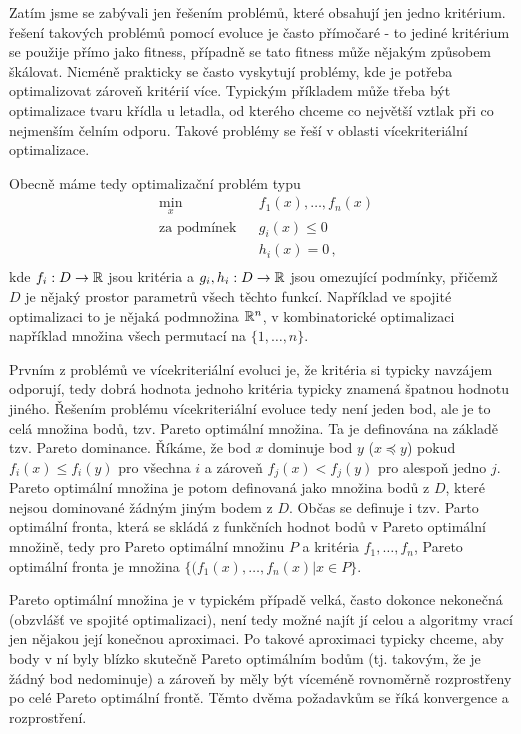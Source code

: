 
Zatím jsme se zabývali jen řešením problémů, které obsahují jen jedno kritérium. řešení takových problémů pomocí evoluce je často přímočaré - to jediné kritérium se použije přímo jako fitness, případně se tato fitness může nějakým způsobem škálovat. Nicméně prakticky se často vyskytují problémy, kde je potřeba optimalizovat zároveň kritérií více. Typickým příkladem může třeba být optimalizace tvaru křídla u letadla, od kterého chceme co největší vztlak při co nejmenším čelním odporu. Takové problémy se řeší v oblasti vícekriteriální optimalizace. 

Obecně máme tedy optimalizační problém typu
\begin{equation*}
  \begin{aligned}
  & \underset{x}{\text{min}} 	& & f_1(x), \dots, f_n(x) \\
  & \text{za podmínek} 				& & g_i(x) \leq 0 \\
  & 													& & h_i(x) = 0 \,,\\
  \end{aligned}
\end{equation*}
kde $f_i: D \to {\ensuremath{\mathbb{R}}}$ jsou kritéria a $g_i, h_i: D \to {\ensuremath{\mathbb{R}}}$ jsou omezující podmínky, přičemž $D$ je nějaký prostor parametrů všech těchto funkcí. Například ve spojité optimalizaci to je nějaká podmnožina ${\mathbb{R}}^n$, v kombinatorické optimalizaci například množina všech permutací na $\{1, \dots, n\}$.

Prvním z problémů ve vícekriteriální evoluci je, že kritéria si typicky navzájem odporují, tedy dobrá hodnota jednoho kritéria typicky znamená špatnou hodnotu jiného. Řešením problému vícekriteriální evoluce tedy není jeden bod, ale je to celá množina bodů, tzv. Pareto optimální množina. Ta je definována na základě tzv. Pareto dominance. Říkáme, že bod $x$ dominuje bod $y$ ($x \preceq y$) pokud $f_i(x) \leq f_i(y)$ pro všechna $i$ a zároveň $f_j(x) < f_j(y)$ pro alespoň jedno $j$. Pareto optimální množina je potom definovaná jako množina bodů z $D$, které nejsou dominované žádným jiným bodem z $D$. Občas se definuje i tzv. Parto optimální fronta, která se skládá z funkčních hodnot bodů v Pareto optimální množině, tedy pro Pareto optimální množinu $P$ a kritéria $f_1, \dots, f_n$, Pareto optimální fronta je množina $\{(f_1(x), \dots, f_n(x)| x \in P\}$. 

Pareto optimální množina je v typickém případě velká, často dokonce nekonečná (obzvlášť ve spojité optimalizaci), není tedy možné najít jí celou a algoritmy vrací jen nějakou její konečnou aproximaci. Po takové aproximaci typicky chceme, aby body v ní byly blízko skutečně Pareto optimálním bodům (tj. takovým, že je žádný bod nedominuje) a zároveň by měly být víceméně rovnoměrně rozprostřeny po celé Pareto optimální frontě. Těmto dvěma požadavkům se říká konvergence a rozprostření.

